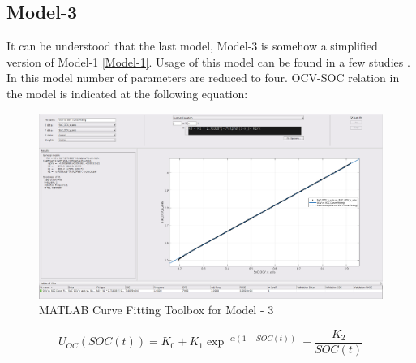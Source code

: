 \documentclass[12pt]{article}
\begin{document}
\begin{appendices}
\subsection{Model-3} \label{Model-3}
It can be understood that the last model, Model-3  is somehow a simplified version of Model-1 \ref{Model-1}. Usage of this model can be found in a few studies \cite{Neumann2011}.  In this model number of parameters are reduced to four. OCV-SOC relation in the model is indicated at the following equation:

\begin{figure}[]
	\centering
	\includegraphics[width=1.0\textwidth, keepaspectratio]{images/Curve_Fitting_3.pdf}
	\caption{MATLAB Curve Fitting Toolbox for Model - 3}
	\label{fig:OCV_SOC_Model_3}
\end{figure}
\vspace{-2mm}
\begin{equation}
	\label{eqn:OCV_SOC_Model_3}
	U_{OC}(SOC(t)) = K_{0} + K_{1}{\exp}^{-\alpha(1-SOC(t))} - \frac{K_{2}}{SOC(t)}
\end{equation}


\end{appendices}
\end{document}
